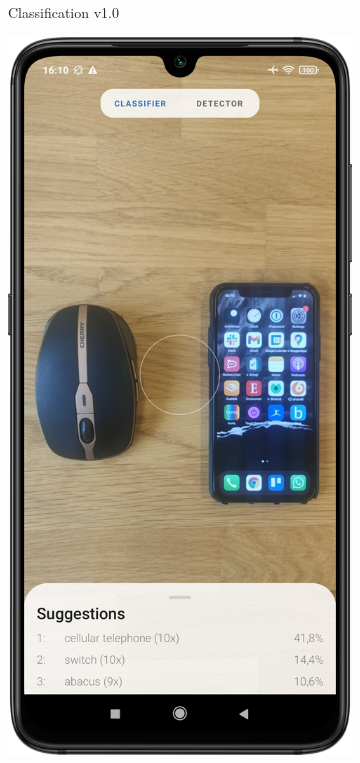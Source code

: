 \documentclass[
			   fontsize=11pt,
               paper=a4,
               bibliography=totoc,
               idxtotoc,
               headsepline,
               footsepline,
               footinclude=false,
               BCOR=12mm,
               DIV=13,
               openany,   %
               oneside    %
               ]
               {scrbook}
\begin{document}
\begin{figure}[H]
\begin{subfigure}{.23\textwidth}
		\caption[Screenshots of the previous app in version 1.0 showing the classification activity]{Classification v1.0}
		\label{fig:appImage11}
	\end{subfigure}
	\hfil
	\begin{subfigure}{.23\textwidth}
		\centering
		\includegraphics[width=\linewidth]{figures/app_class_new.png}

\end{subfigure}
\end{figure}
\end{document}
